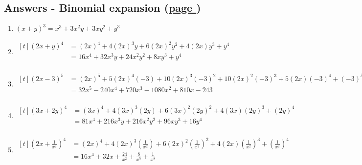 \documentclass[../main.tex]{subfiles}
\begin{document}
\hypertarget{binomialexpansionanswers}{\subsection*{Answers - Binomial expansion (\hyperlink{binomialexpansionlink}{page \pageref{Binomial Expansion}})}}

\label{Binomial expansion answers}
\begin{enumerate}
    \item \( (x+y)^3 = x^3 + 3x^2 y + 3xy^2 +y^3 \)
    \item 
    $
    \!
    \begin{aligned}[t]
     (2x+y)^4 
        &= (2x)^4 + 4(2x)^3y + 6(2x)^2y^2 + 4(2x)y^3 + y^4 \\
        &= 16x^4 + 32x^3y + 24x^2y^2 + 8xy^3 + y^4 \\
    \end{aligned}
    $ 
    \item 
    $
    \!
    \begin{aligned}[t]
     (2x-3)^5 
        &= (2x)^5 + 5(2x)^4(-3) + 10(2x)^3(-3)^2 + 10(2x)^2(-3)^3 + 5(2x)(-3)^4 + (-3)^5 \\
        &= 32x^5 -240x^4 +720x^3 - 1080x^2 + 810x - 243 \\
    \end{aligned}
    $

    \item 
    $
    \!
    \begin{aligned}[t]
     (3x+2y)^4 
        &= (3x)^4 + 4(3x)^3(2y) + 6(3x)^2(2y)^2 + 4(3x)(2y)^3 + (2y)^4 \\
        &= 81x^4 +216x^3y +216x^2y^2 + 96xy^3 + 16y^4 \\
    \end{aligned}
    $

    \item 
    $
    \!
    \begin{aligned}[t]
     (2x + \frac{1}{x^2} )^4 
        &= (2x)^4 + 4(2x)^3(\frac{1}{x^2}) + 6(2x)^2(\frac{1}{x^2})^2 + 4(2x)(\frac{1}{x^2})^3 + (\frac{1}{x^2})^4 \\
        &= 16x^4 + 32x + \frac{24}{x^2} + \frac{8}{x^5} + \frac{1}{x^8}\\
    \end{aligned}
    $
    

\end{enumerate}
\end{document}
